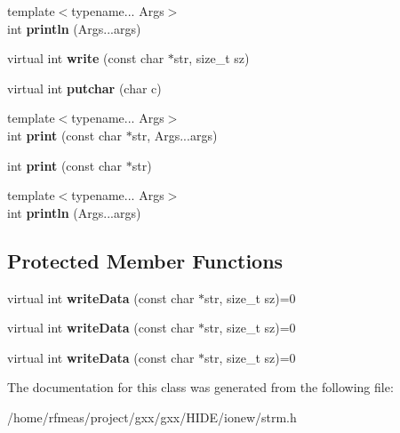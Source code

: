 \begin{DoxyCompactItemize}
\item 
{\footnotesize template$<$typename... Args$>$ }\\int {\bfseries println} (Args...\+args)\hypertarget{classgxx_1_1io_1_1strmout_a14338a75a3d625b1b548f03d93b0f5dd}{}\label{classgxx_1_1io_1_1strmout_a14338a75a3d625b1b548f03d93b0f5dd}

\item 
virtual int {\bfseries write} (const char $\ast$str, size\+\_\+t sz)\hypertarget{classgxx_1_1io_1_1strmout_abb1fc1d2780138a4d176ef25b1742b0d}{}\label{classgxx_1_1io_1_1strmout_abb1fc1d2780138a4d176ef25b1742b0d}

\item 
virtual int {\bfseries putchar} (char c)\hypertarget{classgxx_1_1io_1_1strmout_ac933aaaa835edf900a35d2affaeede7c}{}\label{classgxx_1_1io_1_1strmout_ac933aaaa835edf900a35d2affaeede7c}

\item 
{\footnotesize template$<$typename... Args$>$ }\\int {\bfseries print} (const char $\ast$str, Args...\+args)\hypertarget{classgxx_1_1io_1_1strmout_a6442000afc421a0dd64425cd4915b65b}{}\label{classgxx_1_1io_1_1strmout_a6442000afc421a0dd64425cd4915b65b}

\item 
int {\bfseries print} (const char $\ast$str)\hypertarget{classgxx_1_1io_1_1strmout_a2a57b1ead8397800021d17250b5022ca}{}\label{classgxx_1_1io_1_1strmout_a2a57b1ead8397800021d17250b5022ca}

\item 
{\footnotesize template$<$typename... Args$>$ }\\int {\bfseries println} (Args...\+args)\hypertarget{classgxx_1_1io_1_1strmout_a14338a75a3d625b1b548f03d93b0f5dd}{}\label{classgxx_1_1io_1_1strmout_a14338a75a3d625b1b548f03d93b0f5dd}

\end{DoxyCompactItemize}
\subsection*{Protected Member Functions}
\begin{DoxyCompactItemize}
\item 
virtual int {\bfseries write\+Data} (const char $\ast$str, size\+\_\+t sz)=0\hypertarget{classgxx_1_1io_1_1strmout_a617d2f076acf58fe33593dbc7614830e}{}\label{classgxx_1_1io_1_1strmout_a617d2f076acf58fe33593dbc7614830e}

\item 
virtual int {\bfseries write\+Data} (const char $\ast$str, size\+\_\+t sz)=0\hypertarget{classgxx_1_1io_1_1strmout_a617d2f076acf58fe33593dbc7614830e}{}\label{classgxx_1_1io_1_1strmout_a617d2f076acf58fe33593dbc7614830e}

\item 
virtual int {\bfseries write\+Data} (const char $\ast$str, size\+\_\+t sz)=0\hypertarget{classgxx_1_1io_1_1strmout_a617d2f076acf58fe33593dbc7614830e}{}\label{classgxx_1_1io_1_1strmout_a617d2f076acf58fe33593dbc7614830e}

\end{DoxyCompactItemize}


The documentation for this class was generated from the following file\+:\begin{DoxyCompactItemize}
\item 
/home/rfmeas/project/gxx/gxx/\+H\+I\+D\+E/ionew/strm.\+h\end{DoxyCompactItemize}
